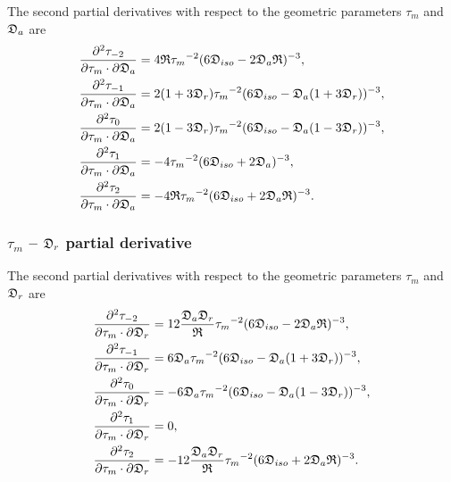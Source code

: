 The second partial derivatives with respect to the geometric parameters $\tau_m$ and $\mathfrak{D}_a$ are
\begin{subequations}
\begin{align}
    \frac{\partial^2 \tau_{-2}}{\partial \tau_m \cdot \partial \mathfrak{D}_a} &= 4\mathfrak{R} {\tau_m}^{-2} (6\mathfrak{D}_{iso} - 2\mathfrak{D}_a\mathfrak{R})^{-3}, \\
    \frac{\partial^2 \tau_{-1}}{\partial \tau_m \cdot \partial \mathfrak{D}_a} &= 2(1 + 3\mathfrak{D}_r){\tau_m}^{-2} (6\mathfrak{D}_{iso} - \mathfrak{D}_a (1 + 3\mathfrak{D}_r))^{-3}, \\
    \frac{\partial^2 \tau_{0}}{\partial \tau_m \cdot \partial \mathfrak{D}_a}  &= 2(1 - 3\mathfrak{D}_r){\tau_m}^{-2} (6\mathfrak{D}_{iso} - \mathfrak{D}_a (1 - 3\mathfrak{D}_r))^{-3}, \\
    \frac{\partial^2 \tau_{1}}{\partial \tau_m \cdot \partial \mathfrak{D}_a}  &= -4{\tau_m}^{-2} (6\mathfrak{D}_{iso} + 2\mathfrak{D}_a)^{-3}, \\
    \frac{\partial^2 \tau_{2}}{\partial \tau_m \cdot \partial \mathfrak{D}_a}  &= -4\mathfrak{R} {\tau_m}^{-2} (6\mathfrak{D}_{iso} + 2\mathfrak{D}_a\mathfrak{R})^{-3}.
\end{align}
\end{subequations}



\subsubsection{$\tau_m$ -- $\mathfrak{D}_r$ partial derivative}

The second partial derivatives with respect to the geometric parameters $\tau_m$ and $\mathfrak{D}_r$ are
\begin{subequations}
\begin{align}
    \frac{\partial^2 \tau_{-2}}{\partial \tau_m \cdot \partial \mathfrak{D}_r} &= 12 \frac{\mathfrak{D}_a \mathfrak{D}_r}{\mathfrak{R}} {\tau_m}^{-2} (6\mathfrak{D}_{iso} - 2\mathfrak{D}_a\mathfrak{R})^{-3}, \\
    \frac{\partial^2 \tau_{-1}}{\partial \tau_m \cdot \partial \mathfrak{D}_r} &= 6 \mathfrak{D}_a {\tau_m}^{-2} (6\mathfrak{D}_{iso} - \mathfrak{D}_a (1 + 3\mathfrak{D}_r))^{-3}, \\
    \frac{\partial^2 \tau_{0}}{\partial \tau_m \cdot \partial \mathfrak{D}_r}  &= -6 \mathfrak{D}_a {\tau_m}^{-2} (6\mathfrak{D}_{iso} - \mathfrak{D}_a (1 - 3\mathfrak{D}_r))^{-3}, \\
    \frac{\partial^2 \tau_{1}}{\partial \tau_m \cdot \partial \mathfrak{D}_r}  &= 0, \\
    \frac{\partial^2 \tau_{2}}{\partial \tau_m \cdot \partial \mathfrak{D}_r}  &= -12 \frac{\mathfrak{D}_a \mathfrak{D}_r}{\mathfrak{R}} {\tau_m}^{-2} (6\mathfrak{D}_{iso} + 2\mathfrak{D}_a\mathfrak{R})^{-3}.
\end{align}
\end{subequations}



